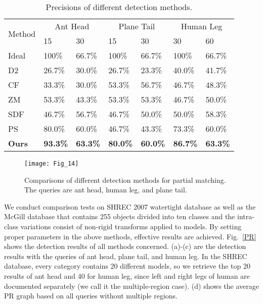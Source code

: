 \begin{table}
\centering
\caption[Precisions of different detection methods.]
 {Precisions of different detection methods.}
  \label{table:precision}
  \renewcommand{\arraystretch}{1.3}
\begin{tabular}{p{}|p{} p{}|p{}p{}|p{}p{}}
\hline %
\multirow{2}{*}{Method} &
\multicolumn{2}{c|}{Ant Head} &
\multicolumn{2}{c|}{Plane Tail} &
\multicolumn{2}{c}{Human Leg} \\
\cline{2-7}
& 15 & 30 & 15 & 30 & 30 & 60\\
\hline
Ideal & 100\% & 66.7\% & 100\% & 66.7\%  & 100\% & 66.7\% \\
D2 & 26.7\% & 30.0\% & 26.7\% & 23.3\%  & 40.0\% & 41.7\% \\
CF & 33.3\% & 30.0\% & 53.3\% & 56.7\%  & 46.7\% & 48.3\% \\
ZM & 53.3\% & 43.3\% & 53.3\% & 53.3\%  & 46.7\% & 50.0\% \\
SDF & 46.7\% & 56.7\% & 46.7\% & 50.0\% & 50.0\% & 58.3\% \\
PS & 80.0\% & 60.0\% & 46.7\% & 43.3\%  & 73.3\% & 60.0\% \\
\textbf{Ours} & \textbf{93.3\%} & \textbf{63.3\%} & \textbf{80.0\%} & \textbf{60.0\%}  & \textbf{86.7\%} & \textbf{63.3\%}\\
\hline
\end{tabular}
\end{table}

\begin{figure*}
\begin{center}
\texttt{[image: Fig\_14]}
\end{center}
\caption[Comparisons of different detection methods for partial matching.]
 {Comparisons of different detection methods for partial
  matching. The queries are ant head, human leg, and plane tail.}
\label{comparison}
\end{figure*}

We conduct comparison tests on SHREC 2007 watertight database as well
as the McGill database that contains 255 objects divided into ten
classes and the intra-class variations consist of non-rigid transforms
applied to models. By setting proper parameters in the above methods,
effective results are achieved. Fig.~\ref{PR} shows the detection
results of all methods concerned. (a)-(c) are the detection results
with the queries of ant head, plane tail, and human leg.  In the SHREC
database, every category contains 20 different models, so we retrieve
the top 20 results of ant head and 40 for human leg, since left and
right legs of human are documented separately (we call it the
multiple-region case). (d) shows the average PR graph based on all
queries without multiple regions.


